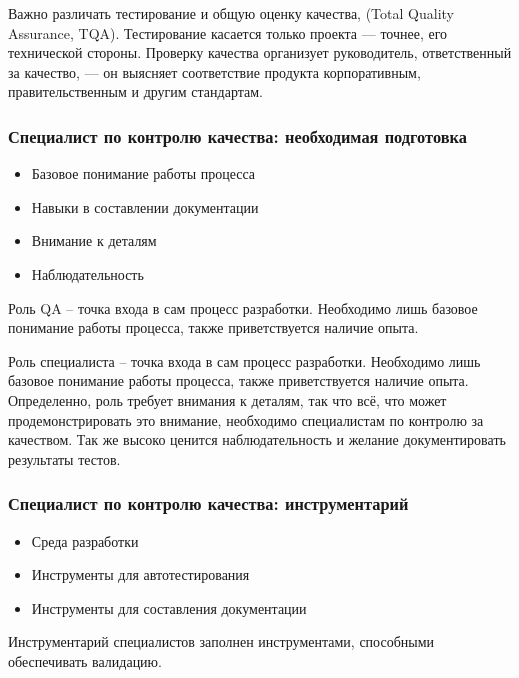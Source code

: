 \documentclass{../industrial-development}
\begin{document}
Важно различать тестирование и общую оценку качества, (Total Quality Assurance, TQA). Тестирование касается только проекта — точнее, его технической стороны. Проверку качества организует руководитель, ответственный за качество, — он выясняет соответствие продукта корпоративным, правительственным и другим стандартам.~\cite{Collective}

\begin{frame} \frametitle{Специалист по контролю качества: необходимая подготовка}
  \begin{itemize}
  \item Базовое понимание работы процесса
  \item Навыки в составлении документации
  \item Внимание к деталям
  \item Наблюдательность 
  \end{itemize}
	\begin{block}{}
	\alert {}Роль QA – точка входа в сам процесс разработки. Необходимо лишь базовое понимание работы процесса, также приветствуется наличие опыта. 
\end{block}

\end{frame}

\lecturenotes

Роль специалиста – точка входа в сам процесс разработки. Необходимо лишь базовое понимание работы процесса, также приветствуется наличие опыта. 
Определенно, роль требует внимания к деталям, так что всё, что может продемонстрировать это внимание, необходимо специалистам по контролю за качеством. Так же высоко ценится наблюдательность и желание документировать результаты тестов. ~\cite{Anatomy}

\begin{frame} \frametitle{Специалист по контролю качества: инструментарий}
  \begin{itemize}
  \item Среда разработки
  \item Инструменты для автотестирования
  \item Инструменты для составления документации
  \end{itemize}

\begin{block}{}
	\alert {}Инструментарий специалистов заполнен инструментами, способными обеспечивать валидацию. 
\end{block}

\end{frame}
\end{document}
